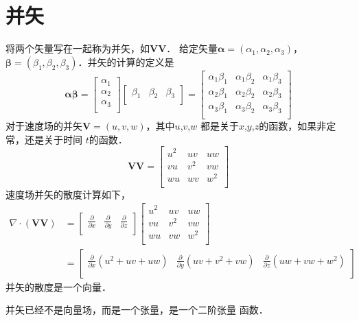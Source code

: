 \section{并矢}
将两个矢量写在一起称为并矢，如$\mathbf{VV}$．
给定矢量$\mathbf{\alpha}=(\alpha_1,\alpha_2,
\alpha_3)$，$\mathbf{\beta}=(\beta_1,\beta_2,
\beta_3)$．并矢的计算的定义是
\[
  \mathbf{\alpha}\mathbf{\beta}=
  \begin{bmatrix}
      \alpha_1	\\
       \alpha_2	\\
      \alpha_3	\\
  \end{bmatrix}
  \begin{bmatrix}
      \beta_1	& \beta_2	& \beta_3	\\
  \end{bmatrix}
  =\begin{bmatrix}
       \alpha_1\beta_1	& \alpha_1\beta_2	& \alpha_1\beta_3\\
       \alpha_2\beta_1	& \alpha_2\beta_2	& \alpha_2\beta_3	\\
       \alpha_3\beta_1	& \alpha_3\beta_2	& \alpha_3\beta_3	\\
   \end{bmatrix}
\]
对于速度场的并矢$\mathbf{V}=(u,v,w)$，其中$u$,$v$,$w$
都是关于$x$,$y$,$z$的函数，如果非定常，还是关于时间
$t$的函数．
\[
  \mathbf{VV}=\begin{bmatrix}
                  u^2	& uv	& uw	\\
                  vu	& v^2	& vw	\\
                  wu	& wv	& w^2	\\
              \end{bmatrix}
\]
速度场并矢的散度计算如下，
\begin{equation*}
  \begin{split}
    \nabla \cdot (\mathbf{VV})&=
  \begin{bmatrix}
      \frac{\partial }{\partial x}	& 
      \frac{\partial }{\partial y}  &
      \frac{\partial }{\partial z}    \\
  \end{bmatrix}
  \begin{bmatrix}
      u^2	& uv	& uw	\\
      vu	& v^2	& vw	\\
      wu	& vw	& w^2	\\
  \end{bmatrix}\\ 
                              &=
   \begin{bmatrix}
      \frac{\partial }{\partial x }(u^2+uv+uw)&
      \frac{\partial}{\partial y }(uv+v^2+vw)&
      \frac{\partial}{\partial z }(uw+vw+w^2)\\
   \end{bmatrix}
\end{split}
\end{equation*}
并矢的散度是一个向量．
\begin{note}
  并矢已经不是向量场，而是一个张量，是一个二阶张量
  函数．
\end{note}

